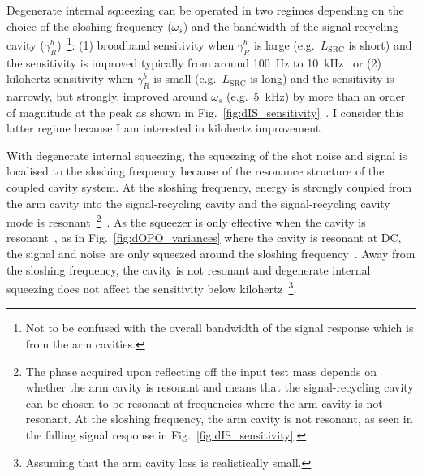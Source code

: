 Degenerate internal squeezing can be operated in two regimes depending on the choice of the sloshing frequency ($\omega_s$) and the bandwidth of the signal-recycling cavity ($\gamma^b_R$)~\footnote{Not to be confused with the overall bandwidth of the signal response which is from the arm cavities.}: (1) broadband sensitivity when $\gamma^b_R$ is large (e.g.\ $L_\text{SRC}$ is short) and the sensitivity is improved typically from around 100~Hz to 10~kHz~\cite{korobkoQuantumExpanderGravitationalwave2019} or (2) kilohertz sensitivity when $\gamma^b_R$ is small (e.g.\ $L_\text{SRC}$ is long) and the sensitivity is narrowly, but strongly, improved around $\omega_s$ (e.g.\ 5~kHz) by more than an order of magnitude at the peak as shown in Fig.~\ref{fig:dIS_sensitivity}~\cite{adyaQuantumEnhancedKHz2020}. I consider this latter regime because I am interested in kilohertz improvement.

With degenerate internal squeezing, the squeezing of the shot noise and signal is localised to the sloshing frequency because of the resonance structure of the coupled cavity system. At the sloshing frequency, energy is strongly coupled from the arm cavity into the signal-recycling cavity and the signal-recycling cavity mode is resonant~\footnote{The phase acquired upon reflecting off the input test mass depends on whether the arm cavity is resonant and means that the signal-recycling cavity can be chosen to be resonant at frequencies where the arm cavity is not resonant. At the sloshing frequency, the arm cavity is not resonant, as seen in the falling signal response in Fig.~\ref{fig:dIS_sensitivity}.}~\cite{korobkoTamingQuantumNoiseHow2020}. As the squeezer is only effective when the cavity is resonant~\cite{}, as in Fig.~\ref{fig:dOPO_variances} where the cavity is resonant at DC, the signal and noise are only squeezed around the sloshing frequency~\cite{}. Away from the sloshing frequency, the cavity is not resonant and degenerate internal squeezing does not affect the sensitivity below kilohertz~\footnote{Assuming that the arm cavity loss is realistically small.}.

